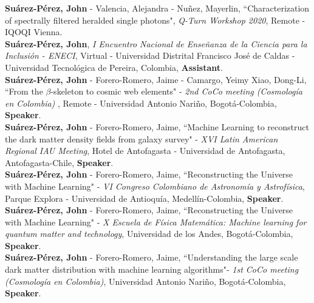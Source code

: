 \documentclass[10pt, a4paper]{article}
\newcommand{\years}[1]{\marginnote{\scriptsize #1}}
\begin{document}
\years{2020}\textbf{Suárez-Pérez, John} - Valencia, Alejandra - Nuñez, Mayerlin, “Characterization of spectrally filtered heralded single photons", \emph{Q-Turn Workshop 2020}, Remote - IQOQI Vienna.\\

\years{2020}\textbf{Suárez-Pérez, John}, \emph{I Encuentro Nacional de Enseñanza de la Ciencia para la Inclusión - ENECI}, Virtual - Universidad Distrital Francisco José de Caldas - Universidad Tecnológica de Pereira, Colombia, \textbf{Assistant}.\\

\years{2020}\textbf{Suárez-Pérez, John} - Forero-Romero, Jaime - Camargo, Yeimy  Xiao, Dong-Li, “From the $\beta$-skeleton to cosmic web elements" - \emph{2nd CoCo meeting (Cosmología en Colombia) }, Remote - Universidad Antonio Nariño, Bogotá-Colombia, \textbf{Speaker}.\\

\years{2019}\textbf{Suárez-Pérez, John} - Forero-Romero, Jaime, “Machine Learning to reconstruct the dark matter density fields from galaxy survey" - \emph{XVI Latin American Regional IAU Meeting}, Hotel de Antofagasta - Universidad de Antofagasta, Antofagasta-Chile, \textbf{Speaker}.\\

\years{2019}\textbf{Suárez-Pérez, John} - Forero-Romero, Jaime, “Reconstructing the Universe with Machine Learning" - \emph{VI Congreso Colombiano de Astronomía y Astrofísica}, Parque Explora - Universidad de Antioquía, Medellín-Colombia, \textbf{Speaker}.\\

\years{2019}\textbf{Suárez-Pérez, John} - Forero-Romero, Jaime, “Reconstructing the Universe with Machine Learning" - \emph{X Escuela de Física Matemática: Machine learning for quantum matter and technology}, Universidad de los Andes, Bogotá-Colombia, \textbf{Speaker}.\\

\years{2019}\textbf{Suárez-Pérez, John} - Forero-Romero, Jaime, “Understanding the large scale dark matter distribution with machine learning algorithms"- \emph{1st CoCo meeting (Cosmología en Colombia)}, Universidad Antonio Nariño, Bogotá-Colombia, \textbf{Speaker}.\\

\end{document}
